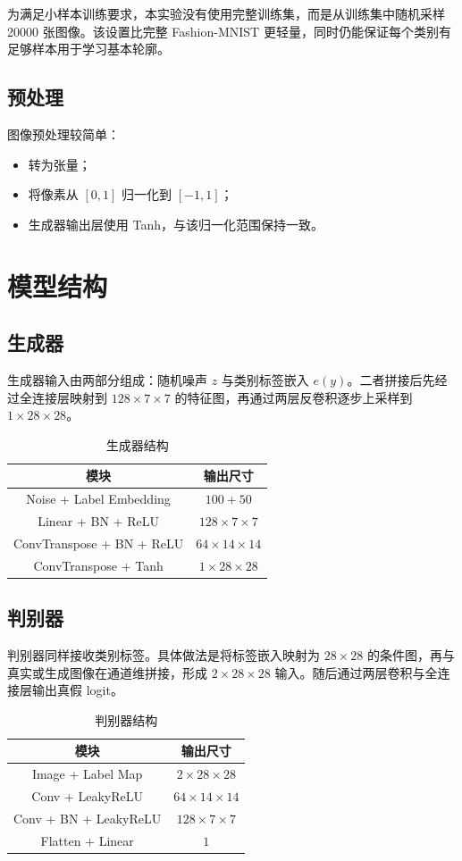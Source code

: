 \documentclass[a4paper,10pt,twocolumn]{article}
\begin{document}
为满足小样本训练要求，本实验没有使用完整训练集，而是从训练集中随机采样 20000 张图像。该设置比完整 Fashion-MNIST 更轻量，同时仍能保证每个类别有足够样本用于学习基本轮廓。

\subsection{预处理}
图像预处理较简单：
\begin{itemize}
  \item 转为张量；
  \item 将像素从 $[0,1]$ 归一化到 $[-1,1]$；
  \item 生成器输出层使用 Tanh，与该归一化范围保持一致。
\end{itemize}

\section{模型结构}
\subsection{生成器}
生成器输入由两部分组成：随机噪声 $z$ 与类别标签嵌入 $e(y)$。二者拼接后先经过全连接层映射到 $128\times7\times7$ 的特征图，再通过两层反卷积逐步上采样到 $1\times28\times28$。

\begin{table}[H]
\centering
\small
\caption{生成器结构}
\begin{tabular}{c|c}
\toprule
模块 & 输出尺寸 \\
\midrule
Noise + Label Embedding & $100+50$ \\
Linear + BN + ReLU & $128\times7\times7$ \\
ConvTranspose + BN + ReLU & $64\times14\times14$ \\
ConvTranspose + Tanh & $1\times28\times28$ \\
\bottomrule
\end{tabular}
\end{table}

\subsection{判别器}
判别器同样接收类别标签。具体做法是将标签嵌入映射为 $28\times28$ 的条件图，再与真实或生成图像在通道维拼接，形成 $2\times28\times28$ 输入。随后通过两层卷积与全连接层输出真假 logit。

\begin{table}[H]
\centering
\small
\caption{判别器结构}
\begin{tabular}{c|c}
\toprule
模块 & 输出尺寸 \\
\midrule
Image + Label Map & $2\times28\times28$ \\
Conv + LeakyReLU & $64\times14\times14$ \\
Conv + BN + LeakyReLU & $128\times7\times7$ \\
Flatten + Linear & $1$ \\
\bottomrule
\end{tabular}
\end{table}
\end{document}
